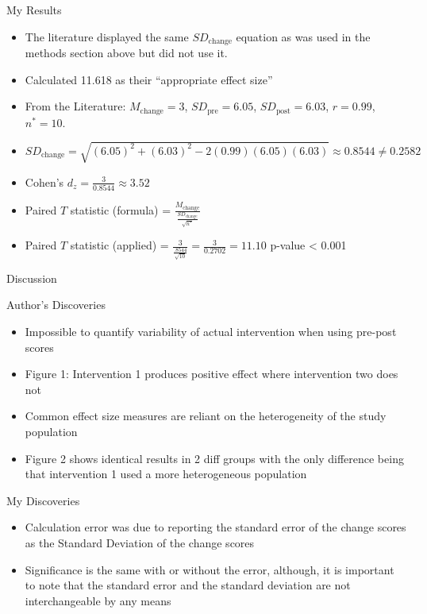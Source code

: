 \documentclass[
  ignorenonframetext,
  aspectratio=169,
]{beamer}
\providecommand{\tightlist}{%
  \setlength{\itemsep}{0pt}\setlength{\parskip}{0pt}}
\begin{document}
\begin{frame}{My Results}
\protect\hypertarget{my-results}{}
\begin{itemize}
\tightlist
\item
  The literature displayed the same \(SD_\text{change}\) equation as was
  used in the methods section above but did not use it.
\item
  Calculated 11.618 as their ``appropriate effect size''
\item
  From the Literature: \(M_\text{change}=3\), \(SD_\text{pre}=6.05\),
  \(SD_\text{post}=6.03\), \(r=0.99\), \(n^*=10\).
\item
  \(SD_{\text{change}}=\sqrt{(6.05)^2+(6.03)^2-2(0.99)(6.05)(6.03)}\approx 0.8544 \neq 0.2582\)
\item
  Cohen's \(d_z= \frac{3}{0.8544}\approx3.52\)
\item
  Paired \(T\) statistic (formula) =
  \(\frac{M_{\text{change}}}{\frac{SD_\text{change}}{\sqrt{n^*}}}\)
\item
  Paired \(T\) statistic (applied) =
  \(\frac{3}{\frac{.8544}{\sqrt{10}}}= \frac{3}{0.2702}=11.10\) p-value
  \textless{} 0.001
\end{itemize}
\end{frame}

\begin{frame}{Discussion}
\protect\hypertarget{discussion}{}
\begin{block}{Author's Discoveries}
\protect\hypertarget{authors-discoveries}{}
\begin{itemize}
\item
  Impossible to quantify variability of actual intervention when using
  pre-post scores
\item
  Figure 1: Intervention 1 produces positive effect where intervention
  two does not
\item
  Common effect size measures are reliant on the heterogeneity of the
  study population
\item
  Figure 2 shows identical results in 2 diff groups with the only
  difference being that intervention 1 used a more heterogeneous
  population
\end{itemize}
\end{block}

\begin{block}{My Discoveries}
\protect\hypertarget{my-discoveries}{}
\begin{itemize}
\item
  Calculation error was due to reporting the standard error of the
  change scores as the Standard Deviation of the change scores
\item
  Significance is the same with or without the error, although, it is
  important to note that the standard error and the standard deviation
  are not interchangeable by any means
\end{itemize}
\end{block}
\end{frame}
\end{document}
